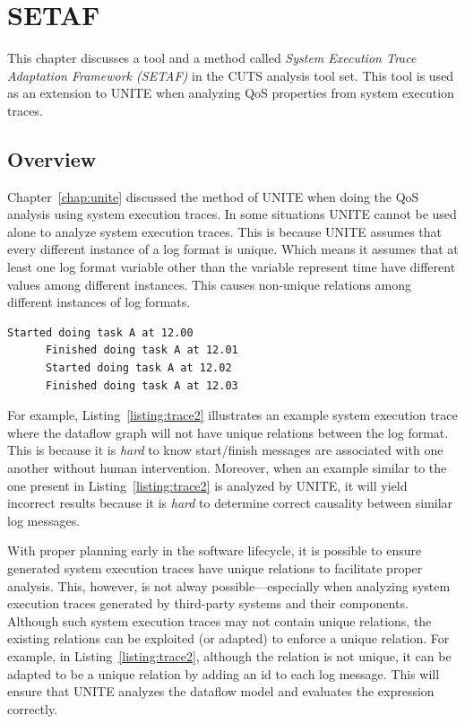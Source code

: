 \chapter{SETAF}
\label{chap:setaf}

This chapter discusses a tool and a method called \textit{System 
Execution Trace Adaptation Framework (SETAF)} in the CUTS  analysis 
tool set. This tool is used as an extension to UNITE when analyzing QoS 
properties from system execution traces.

\section{Overview}
\label{sec:setaf-overview}

Chapter~\ref{chap:unite} discussed the method of UNITE when doing the 
QoS analysis using system execution traces. In some situations UNITE cannot 
be used alone to analyze system execution traces. This is because UNITE 
assumes that every different instance of a log format is unique. Which means 
it assumes that at least one log format variable other than the variable represent 
time have different values among different instances. This causes non-unique 
relations among different instances of log formats.

\begin{lstlisting}[label=listing:trace2, 
caption=Portion of a system execution trace that does not 
contain unique relations ., captionpos=b]
      Started doing task A at 12.00
      Finished doing task A at 12.01
      Started doing task A at 12.02
      Finished doing task A at 12.03
\end{lstlisting}

For example, Listing~\ref{listing:trace2} illustrates 
an example system execution trace where the dataflow graph
will not have unique relations between the log format. This 
is because it is \textit{hard} to know start/finish messages 
are associated with one another without human intervention.
Moreover, when an example similar to the one present in 
Listing~\ref{listing:trace2} is analyzed by UNITE, it 
will yield incorrect results because it is \textit{hard} to 
determine correct causality between similar log messages.

With proper planning early in the software lifecycle, it is
possible to ensure generated system execution traces have unique
relations to facilitate proper analysis. This, however, is not
alway possible---especially when analyzing system execution traces
generated by third-party systems and their components. Although
such system execution traces may not contain unique 
relations, the existing relations can be exploited (or adapted) 
to enforce a unique relation. For example, in 
Listing~\ref{listing:trace2}, although the relation is 
not unique, it can be adapted to be a unique relation by adding 
an id to each log message. This will ensure that UNITE analyzes 
the dataflow model and evaluates the expression correctly. 

